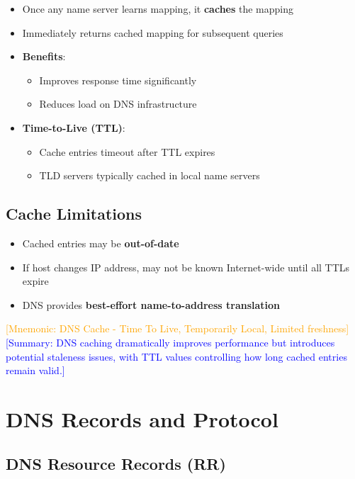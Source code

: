 \documentclass[12pt]{article}
\begin{document}
\begin{itemize}
    \item Once any name server learns mapping, it \textbf{caches} the mapping
    \item Immediately returns cached mapping for subsequent queries
    \item \textbf{Benefits}:
          \begin{itemize}
              \item Improves response time significantly
              \item Reduces load on DNS infrastructure
          \end{itemize}
    \item \textbf{Time-to-Live (TTL)}:
          \begin{itemize}
              \item Cache entries timeout after TTL expires
              \item TLD servers typically cached in local name servers
          \end{itemize}
\end{itemize}

\subsection{Cache Limitations}
\begin{itemize}
    \item Cached entries may be \textbf{out-of-date}
    \item If host changes IP address, may not be known Internet-wide until all TTLs expire
    \item DNS provides \textbf{best-effort name-to-address translation}
\end{itemize}

\textcolor{orange}{[Mnemonic: DNS Cache - Time To Live, Temporarily Local, Limited freshness]}
\textcolor{blue}{[Summary: DNS caching dramatically improves performance but introduces potential staleness issues, with TTL values controlling how long cached entries remain valid.]}

\section{DNS Records and Protocol}
\subsection{DNS Resource Records (RR)}
\end{document}
